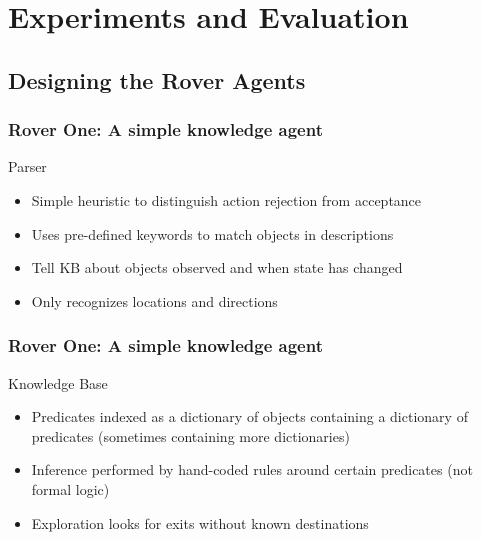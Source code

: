 \section{Experiments and Evaluation}

\subsection{Designing the Rover Agents}

\begin{frame}
    \centering
    \insertsubsectionhead
\end{frame}

\begin{frame}
    \frametitle{Rover One: A simple knowledge agent}

    \begin{block}{Parser}
        \begin{itemize}
            \item Simple heuristic to distinguish action rejection from
                acceptance
            \item Uses pre-defined keywords to match objects in
                descriptions
            \item Tell KB about objects observed and when state has
                changed
            \item Only recognizes locations and directions
        \end{itemize}
    \end{block}

\end{frame}

\begin{frame}
    \frametitle{Rover One: A simple knowledge agent}

    \begin{block}{Knowledge Base}
        \begin{itemize}
            \item Predicates indexed as a dictionary of objects
                containing a dictionary of predicates (sometimes
                containing more dictionaries)
            \item Inference performed by hand-coded rules around certain
                predicates (not formal logic)
            \item Exploration looks for exits without known destinations
        \end{itemize}
    \end{block}
\end{frame}

